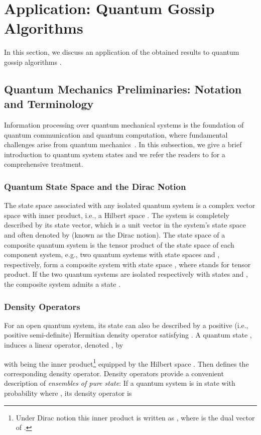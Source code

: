 \documentclass[a4paper, 11pt]{article}
\begin{document}
\section{Application: Quantum Gossip Algorithms}\label{Sec:Quantum}
In this section, we discuss {an} application of the obtained results to quantum gossip algorithms \cite{Mazzarella2013a,Mazzarella2013b}.

{
\subsection{Quantum Mechanics Preliminaries:  Notation and Terminology }
Information processing over quantum mechanical systems is the foundation of quantum communication and quantum computation, where fundamental challenges arise from quantum mechanics~\cite{Nielsen}. In this subsection, we give a brief introduction to quantum system states and we refer the readers  to \cite{Nielsen} for a comprehensive treatment.


\subsubsection{Quantum State Space and the Dirac Notion}
  The state space associated with any isolated quantum system is a complex vector space with inner product, {i.e.}, a Hilbert space . The system is completely described by its state vector, which is a unit vector in the system's state space and often denoted by   (known as the Dirac notion). The state space of a composite quantum system is the tensor product of the state space of each component system, e.g., two quantum systems with state spaces  and , respectively, form a composite system with state space , where  stands for tensor product. If the two quantum systems are isolated respectively with states   and , the composite system admits a state .

\subsubsection{Density Operators}
For an open quantum system, its state can also be described by a positive (i.e., positive semi-definite) Hermitian density operator   satisfying . A quantum state , induces a linear operator, denoted , by

  with  being the inner product\footnote{Under Dirac notion this inner product is written as , where  is the dual vector of .} equipped by the Hilbert space . Then  defines the corresponding density operator. Density operators provide a convenient description of {\it ensembles of pure state}: If a quantum system is in state  with probability  where , its density operator is
  
}
\end{document}
